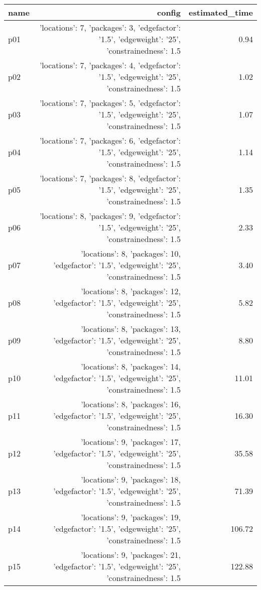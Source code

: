 \documentclass{article}
\begin{document}
                            \begin{center}
                            \scriptsize
                            \begin{tabular}{@{}l|r|r@{}}
                            name & config & estimated\_time\\\midrule
                              p01&{'locations': 7, 'packages': 3, 'edgefactor': '1.5', 'edgeweight': '25', 'constrainedness': 1.5}&0.94\\
  p02&{'locations': 7, 'packages': 4, 'edgefactor': '1.5', 'edgeweight': '25', 'constrainedness': 1.5}&1.02\\
  p03&{'locations': 7, 'packages': 5, 'edgefactor': '1.5', 'edgeweight': '25', 'constrainedness': 1.5}&1.07\\
  p04&{'locations': 7, 'packages': 6, 'edgefactor': '1.5', 'edgeweight': '25', 'constrainedness': 1.5}&1.14\\
  p05&{'locations': 7, 'packages': 8, 'edgefactor': '1.5', 'edgeweight': '25', 'constrainedness': 1.5}&1.35\\
  p06&{'locations': 8, 'packages': 9, 'edgefactor': '1.5', 'edgeweight': '25', 'constrainedness': 1.5}&2.33\\
  p07&{'locations': 8, 'packages': 10, 'edgefactor': '1.5', 'edgeweight': '25', 'constrainedness': 1.5}&3.40\\
  p08&{'locations': 8, 'packages': 12, 'edgefactor': '1.5', 'edgeweight': '25', 'constrainedness': 1.5}&5.82\\
  p09&{'locations': 8, 'packages': 13, 'edgefactor': '1.5', 'edgeweight': '25', 'constrainedness': 1.5}&8.80\\
  p10&{'locations': 8, 'packages': 14, 'edgefactor': '1.5', 'edgeweight': '25', 'constrainedness': 1.5}&11.01\\
  p11&{'locations': 8, 'packages': 16, 'edgefactor': '1.5', 'edgeweight': '25', 'constrainedness': 1.5}&16.30\\
  p12&{'locations': 9, 'packages': 17, 'edgefactor': '1.5', 'edgeweight': '25', 'constrainedness': 1.5}&35.58\\
  p13&{'locations': 9, 'packages': 18, 'edgefactor': '1.5', 'edgeweight': '25', 'constrainedness': 1.5}&71.39\\
  p14&{'locations': 9, 'packages': 19, 'edgefactor': '1.5', 'edgeweight': '25', 'constrainedness': 1.5}&106.72\\
  p15&{'locations': 9, 'packages': 21, 'edgefactor': '1.5', 'edgeweight': '25', 'constrainedness': 1.5}&122.88\\

\end{tabular}
\end{center}
\end{document}

